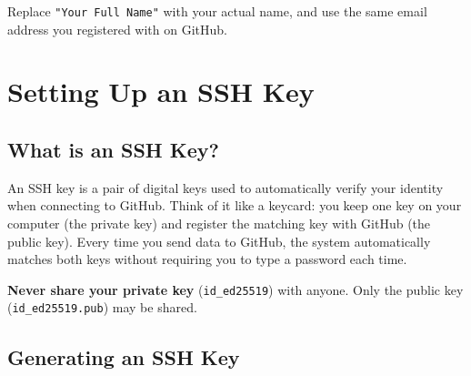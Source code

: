 \documentclass[
    a4paper,
    11pt,
    parskip=half
]{scrartcl}
\begin{document}
\begin{notebox}
Replace \texttt{"Your Full Name"} with your actual name, and use the same email address you registered with on GitHub.
\end{notebox}

\section{Setting Up an SSH Key}
\label{sec:ssh-key}

\subsection{What is an SSH Key?}

An SSH key is a pair of digital keys used to automatically verify your identity when connecting to GitHub. Think of it like a keycard: you keep one key on your computer (the private key) and register the matching key with GitHub (the public key). Every time you send data to GitHub, the system automatically matches both keys without requiring you to type a password each time.

\begin{warningbox}
\textbf{Never share your private key} (\texttt{id\_ed25519}) with anyone. Only the public key (\texttt{id\_ed25519.pub}) may be shared.
\end{warningbox}

\subsection{Generating an SSH Key}
\label{sec:generate-key}
\end{document}
